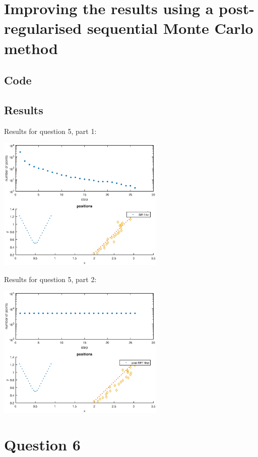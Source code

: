 \documentclass[english,DIV=13]{scrreprt}
\begin{document}
\chapter{Improving the results using a post-regularised sequential
Monte Carlo method}
\section*{Code}

\section*{Results}
Results for question 5, part 1:
\begin{center}
   \includegraphics[width=0.6\textwidth]{img/q51.eps}
\end{center}

Results for question 5, part 2:
\begin{center}
   \includegraphics[width=0.6\textwidth]{img/q52.eps}
\end{center}

\chapter{Question 6}
\end{document}
